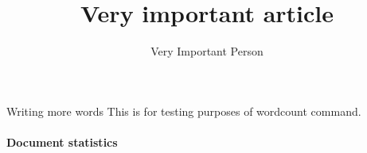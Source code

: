 \documentclass[a4paper]{article}
\title{Very important article}
\author{Very Important Person}
\newcommand\wordcount{}
\begin{document}
\maketitle

Writing more words
This is for testing purposes of wordcount command.

\paragraph{Document statistics}
\wordcount
\end{document}
